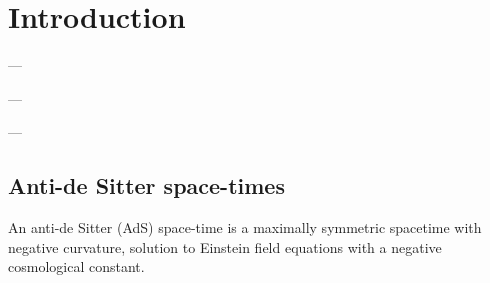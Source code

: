\documentclass[twocolumn]{revtex4}
\begin{document}


\section{Introduction} \label{s:Intro}

---

---

---



\subsection{Anti-de Sitter space-times} \label{ss:AdS}

An anti-de Sitter (AdS) space-time is a maximally symmetric spacetime with negative curvature, solution to Einstein field equations with a negative cosmological constant.


\end{document}
